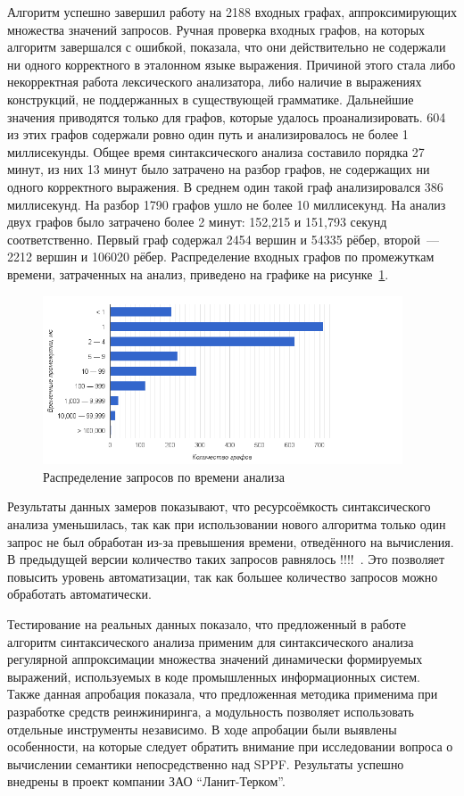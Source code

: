 Алгоритм успешно завершил работу на 2188 входных графах, аппроксимирующих множества значений запросов. Ручная проверка входных графов, на которых алгоритм завершался с ошибкой, показала, что они действительно не содержали ни одного корректного в эталонном языке выражения. Причиной этого стала либо некорректная работа лексического анализатора, либо наличие в выражениях конструкций, не поддержанных в существующей грамматике. Дальнейшие значения приводятся только для графов, которые удалось проанализировать. 604 из этих графов содержали ровно один путь и анализировалось не более 1 миллисекунды. Общее время синтаксического анализа составило порядка 27 минут, из них 13 минут было затрачено на разбор графов, не содержащих ни одного корректного выражения. В среднем один такой граф анализировался 386 миллисекунд. На разбор 1790 графов ушло не более 10 миллисекунд. На анализ двух графов было затрачено более 2 минут: 152,215 и 151,793 секунд соответственно. Первый граф содержал 2454 вершин и 54335 рёбер, второй~--- 2212 вершин и 106020 рёбер. Распределение входных графов по промежуткам времени, затраченных на анализ, приведено на графике на рисунке~\ref{distr}.

\begin{figure}[H]
  \centering
 \includegraphics[width=0.95\textwidth]{pics/distr.png}
 \caption{Распределение запросов по времени анализа}
 \label{distr}
\end{figure}

Результаты данных замеров показывают, что ресурсоёмкость синтаксического анализа уменьшилась, так как при использовании нового алгоритма только один запрос не был обработан из-за превышения времени, отведённого на вычисления. В предыдущей версии количество таких запросов равнялось !!!!~\cite{Syrcose}. Это позволяет повысить уровень автоматизации, так как большее количество запросов можно обработать автоматически.

Тестирование на реальных данных показало, что предложенный в работе алгоритм синтаксического анализа применим для синтаксического анализа регулярной аппроксимации множества значений динамически формируемых выражений, используемых в коде промышленных информационных систем. Также данная апробация показала, что предложенная методика применима при разработке средств реинжиниринга, а модульность позволяет использовать отдельные инструменты независимо. В ходе апробации были выявлены особенности, на которые следует обратить внимание при исследовании вопроса о вычислении семантики непосредственно над SPPF. Результаты успешно внедрены в проект компании ЗАО ``Ланит-Терком''.


